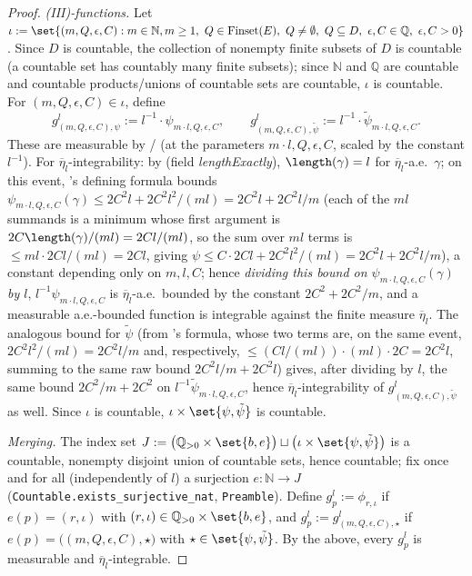 \begin{proof}
  \emph{(III)-functions.} Let $\iota := \set{(m,Q,\epsilon,C) : m\in\mathbb{N}, m\ge1,\ Q\in
  \mathrm{Finset}(E),\ Q\ne\emptyset,\ Q\subseteq D,\ \epsilon,C\in\mathbb{Q},\ \epsilon,C>0}$. Since
  $D$ is countable, the collection of nonempty finite subsets of $D$ is countable (a countable set
  has countably many finite subsets); since $\mathbb{N}$ and $\mathbb{Q}$ are countable and
  countable products/unions of countable sets are countable, $\iota$ is countable. For
  $(m,Q,\epsilon,C)\in\iota$, define
  \[
    g^l_{(m,Q,\epsilon,C),\psi} := l^{-1}\cdot \psi_{m\cdot l,Q,\epsilon,C}
    ,\qquad
    g^l_{(m,Q,\epsilon,C),\tilde\psi} := l^{-1}\cdot \tilde\psi_{m\cdot l,Q,\epsilon,C}
    .
  \]
  These are measurable by / (at the parameters
  $m\cdot l,Q,\epsilon,C$, scaled by the constant $l^{-1}$). For $\overline\eta_l$-integrability:
  by  (field \emph{lengthExactly}), $\length(\gamma)=l$ for $\overline\eta_l$-a.e.\
  $\gamma$; on this event, 's defining formula bounds
  $\psi_{m\cdot l,Q,\epsilon,C}(\gamma) \le 2C^2 l + 2C^2 l^2/(ml)= 2C^2 l + 2C^2l/m$ (each of the
  $ml$ summands is a minimum whose first argument is $2C\length(\gamma)/(ml)=2Cl/(ml)$, so the sum
  over $ml$ terms is $\le ml\cdot 2Cl/(ml) = 2Cl$, giving
  $\psi \le C\cdot 2Cl + 2C^2l^2/(ml) = 2C^2l+2C^2l/m$), a constant depending only on $m,l,C$; hence
  \emph{dividing this bound on $\psi_{m\cdot l,Q,\epsilon,C}(\gamma)$ by $l$},
  $l^{-1}\psi_{m\cdot l,Q,\epsilon,C}$ is $\overline\eta_l$-a.e.\ bounded by the constant
  $2C^2+2C^2/m$, and a measurable a.e.-bounded function is integrable against the finite measure
  $\overline\eta_l$. The analogous bound for $\tilde\psi$ (from \noderef{psiTilde}'s formula, whose
  two terms are, on the same event, $2C^2l^2/(ml)=2C^2l/m$ and, respectively,
  $\le (Cl/(ml))\cdot(ml)\cdot 2C = 2C^2l$, summing to the same raw bound $2C^2l/m+2C^2l$) gives,
  after dividing by $l$, the same bound $2C^2/m+2C^2$ on $l^{-1}\tilde\psi_{m\cdot l,Q,\epsilon,C}$,
  hence $\overline\eta_l$-integrability of $g^l_{(m,Q,\epsilon,C),\tilde\psi}$ as well. Since
  $\iota$ is countable, $\iota \times \set{\psi,\tilde\psi}$ is countable.

  \emph{Merging.} The index set
  $J := \bigl(\mathbb{Q}_{>0}\times\set{b,e}\bigr) \sqcup \bigl(\iota\times\set{\psi,\tilde\psi}\bigr)$
  is a countable, nonempty disjoint union of countable sets, hence countable; fix once and for all
  (independently of $l$) a surjection $e\colon\mathbb{N}\to J$ (\texttt{Countable.exists\_surjective\_nat},
  \texttt{Preamble}). Define $g^l_p := \phi_{r,\iota}$ if $e(p)=(r,\iota)$ with
  $(r,\iota)\in\mathbb{Q}_{>0}\times\set{b,e}$, and $g^l_p := g^l_{(m,Q,\epsilon,C),\star}$ if
  $e(p) = \bigl((m,Q,\epsilon,C),\star\bigr)$ with $\star\in\set{\psi,\tilde\psi}$. By the above,
  every $g^l_p$ is measurable and $\overline\eta_l$-integrable.


\end{proof}

